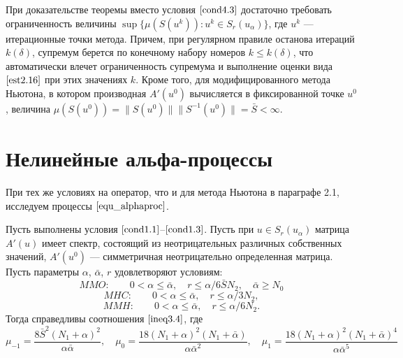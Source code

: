 {\remark При доказательстве теоремы вместо условия  $\eqref{cond4.3}$ достаточно требовать ограниченность величины $\sup\{\mu(S(u^k)): u^k \in S_r(u_\alpha)\}$, где $u^k$ --- итерационные точки метода. Причем, при регулярном правиле останова итераций $k(\delta)$, супремум берется по конечному набору номеров $k\le k(\delta)$, что автоматически влечет ограниченность супремума и выполнение оценки вида $\eqref{est2.16}$ при этих значениях $k$. Кроме того, для модифицированного метода Ньютона, в котором производная $A'(u^0)$ вычисляется в фиксированной точке $u^0$, величина $\mu(S(u^0))=\|S(u^0)\|\|S^{-1}(u^0)\|=\bar S<\infty$.}

\newpage
\section{Нелинейные альфа-процессы}
При тех же условиях на оператор, что и для метода Ньютона в параграфе 2.1, исследуем процессы $\eqref{equ_alphaproc}$.
\begin{theorem}\label{teo4.2}
	Пусть выполнены условия $\eqref{cond1.1}$--$\eqref{cond1.3}$. Пусть при $u \in S_r(u_\alpha)$ матрица $A'(u)$ имеет спектр, состоящий из неотрицательных различных собственных значений, $A'(u^0)$ --- симметричная неотрицательно определенная матрица. Пусть параметры $\alpha$, $\bar{\alpha}$, $r$ удовлетворяют условиям: 
	\begin{equation}\label{cond4.4}
	MMO:\qquad 0<\alpha\le\bar\alpha, \quad r\le\alpha /6\bar SN_2, \quad \bar\alpha \ge N_0
	\end{equation}
	\begin{equation}\label{cond4.5}
	MHC:\qquad 0<\alpha\le\bar\alpha, \quad r\le\alpha /3N_2,
	\end{equation}
	\begin{equation}\label{cond4.6}
	MMH:\qquad 0<\alpha\le\bar\alpha, \quad r\le\alpha /6N_2.
	\end{equation}
	Тогда справедливы соотношения  $\eqref{ineq3.4}$, где
	\begin{equation}\label{eq4.7}
	\mu _{-1}=\frac{8\bar S^2(N_1+\alpha)^2}{\alpha\bar\alpha}, \quad \mu _0=\frac{18(N_1+\alpha)^2(N_1+\bar\alpha)}{\alpha\bar\alpha ^2}, \quad \mu _1=\frac{18(N_1+\alpha)^2(N_1+\bar\alpha)^4}{\alpha\bar\alpha ^5}
	\end{equation}
\end{theorem}
